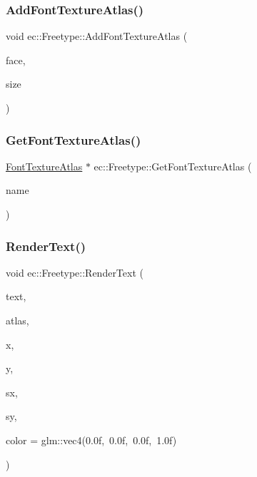 \mbox{\label{classec_1_1_freetype_a7d2e7d19b11c6ba77d4573684db0236d}} 
\subsubsection{\texorpdfstring{Add\+Font\+Texture\+Atlas()}{AddFontTextureAtlas()}}
{\footnotesize\ttfamily void ec\+::\+Freetype\+::\+Add\+Font\+Texture\+Atlas (\begin{DoxyParamCaption}\item[{const std\+::string \&}]{face,  }\item[{unsigned int}]{size }\end{DoxyParamCaption})}

\mbox{\label{classec_1_1_freetype_a0bb0fcf03be07a5d9dc46a4b165c9194}} 
\subsubsection{\texorpdfstring{Get\+Font\+Texture\+Atlas()}{GetFontTextureAtlas()}}
{\footnotesize\ttfamily \mbox{\hyperlink{classec_1_1_font_texture_atlas}{Font\+Texture\+Atlas}} $\ast$ ec\+::\+Freetype\+::\+Get\+Font\+Texture\+Atlas (\begin{DoxyParamCaption}\item[{const std\+::string \&}]{name }\end{DoxyParamCaption})}

\mbox{\label{classec_1_1_freetype_a261c78852689e058598806fe66c39300}} 
\subsubsection{\texorpdfstring{Render\+Text()}{RenderText()}}
{\footnotesize\ttfamily void ec\+::\+Freetype\+::\+Render\+Text (\begin{DoxyParamCaption}\item[{const char $\ast$}]{text,  }\item[{\mbox{\hyperlink{classec_1_1_font_texture_atlas}{Font\+Texture\+Atlas}} $\ast$}]{atlas,  }\item[{float}]{x,  }\item[{float}]{y,  }\item[{float}]{sx,  }\item[{float}]{sy,  }\item[{const glm\+::vec4 \&}]{color = {\ttfamily glm\+:\+:vec4(0.0f,~0.0f,~0.0f,~1.0f)} }\end{DoxyParamCaption})}



